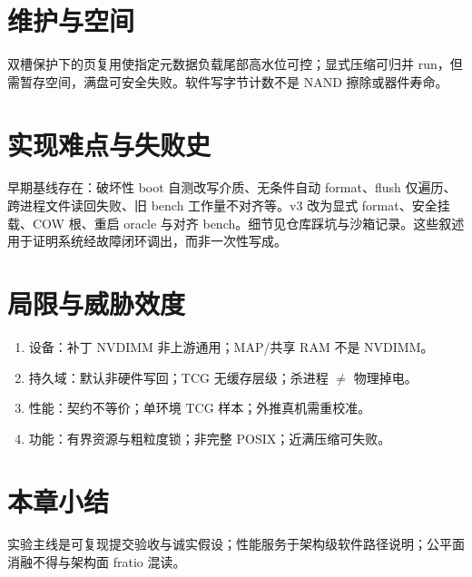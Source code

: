 \section{维护与空间}

双槽保护下的页复用使指定元数据负载尾部高水位可控；显式压缩可归并 run，但需暂存空间，满盘可安全失败。软件写字节计数不是 NAND 擦除或器件寿命。

\section{实现难点与失败史}

早期基线存在：破坏性 boot 自测改写介质、无条件自动 format、flush 仅遍历、跨进程文件读回失败、旧 bench 工作量不对齐等。v3 改为显式 format、安全挂载、COW 根、重启 oracle 与对齐 bench。细节见仓库踩坑与沙箱记录。这些叙述用于证明系统经故障闭环调出，而非一次性写成。

\section{局限与威胁效度}

\begin{enumerate}[leftmargin=2em]
  \item 设备：补丁 NVDIMM 非上游通用；MAP/共享 RAM 不是 NVDIMM。
  \item 持久域：默认非硬件写回；TCG 无缓存层级；杀进程 $\neq$ 物理掉电。
  \item 性能：契约不等价；单环境 TCG 样本；外推真机需重校准。
  \item 功能：有界资源与粗粒度锁；非完整 POSIX；近满压缩可失败。
\end{enumerate}

\section{本章小结}

实验主线是可复现提交验收与诚实假设；性能服务于架构级软件路径说明；公平面消融不得与架构面 fratio 混读。
